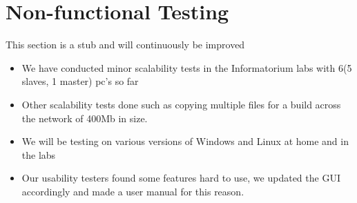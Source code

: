 \documentclass[a4paper,12pt,final]{article}
\begin{document}
\newpage
\section{Non-functional Testing}
This section is a stub and will continuously be improved
\begin{itemize}
\item We have conducted minor scalability tests in the Informatorium labs with 6(5 slaves, 1 master) pc's so far
\item Other scalability tests done such as copying multiple files for a build across the network of 400Mb in size.
\item We will be testing on various versions of Windows and Linux at home and in the labs
\item Our usability testers found some features hard to use, we updated the GUI accordingly and made a user manual for this reason.
\end{itemize}
\end{document}
